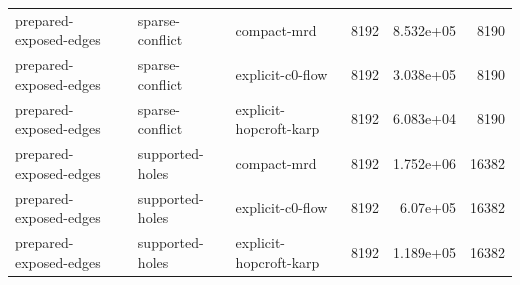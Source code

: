 \begin{table}[t]
\begin{tabular}{lllrrr}
prepared-exposed-edges & sparse-conflict & compact-mrd & 8192 & 8.532e+05 & 8190 \\
prepared-exposed-edges & sparse-conflict & explicit-c0-flow & 8192 & 3.038e+05 & 8190 \\
prepared-exposed-edges & sparse-conflict & explicit-hopcroft-karp & 8192 & 6.083e+04 & 8190 \\
prepared-exposed-edges & supported-holes & compact-mrd & 8192 & 1.752e+06 & 16382 \\
prepared-exposed-edges & supported-holes & explicit-c0-flow & 8192 & 6.07e+05 & 16382 \\
prepared-exposed-edges & supported-holes & explicit-hopcroft-karp & 8192 & 1.189e+05 & 16382 \\
\bottomrule
\end{tabular}
\end{table}

